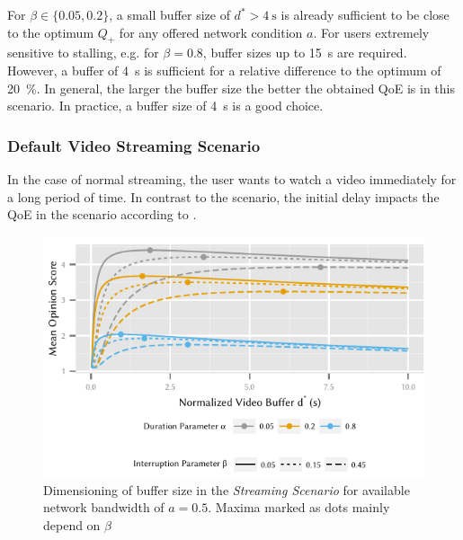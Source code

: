 For \(\beta \in \{0.05,0.2\}\), a small buffer size of \(d^*>\SI{4}{\second}\) is already sufficient to be close to the optimum \(Q_+\) for any offered network condition \(a\).
For users extremely sensitive to stalling, e.g. for \(\beta=0.8\), buffer sizes up to \SI{15}{\second} are required.
However, a buffer of \SI{4}{\second} is sufficient for a relative difference to the optimum of \SI{20}{\percent}. 
In general, the larger the buffer size the better the obtained \gls{QoE} is in this scenario. In practice, a buffer size of \SI{4}{\second} is a good choice.

\subsubsection*{Default Video Streaming Scenario}\label{sec:application:qoe_user_behaviour:typical_user_scenarios:default}

In the case of normal streaming, the user wants to watch a video immediately for a long period of time.
In contrast to the \watchLater scenario, the initial delay impacts the \gls{QoE} in the \watchNow scenario according to .

\begin{figure}
  \centering
  \includegraphics{application/qoe_user_behaviour/user_scenarios/figures/default_scenario}
  \caption{Dimensioning of buffer size in the \emph{Streaming Scenario} for available network bandwidth of \(a = 0.5\). Maxima marked as dots mainly depend on \(\beta\)}
  \label{fig:application:qoe_user_behaviour:typical_user_scenarios:default:default_scenario}
\end{figure}

